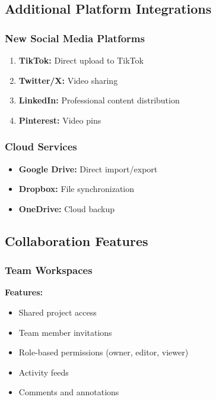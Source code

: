 \subsection{Additional Platform Integrations}

\subsubsection{New Social Media Platforms}

\begin{enumerate}
    \item \textbf{TikTok:} Direct upload to TikTok
    \item \textbf{Twitter/X:} Video sharing
    \item \textbf{LinkedIn:} Professional content distribution
    \item \textbf{Pinterest:} Video pins
\end{enumerate}

\subsubsection{Cloud Services}

\begin{itemize}
    \item \textbf{Google Drive:} Direct import/export
    \item \textbf{Dropbox:} File synchronization
    \item \textbf{OneDrive:} Cloud backup
\end{itemize}

\subsection{Collaboration Features}

\subsubsection{Team Workspaces}

\textbf{Features:}

\begin{itemize}
    \item Shared project access
    \item Team member invitations
    \item Role-based permissions (owner, editor, viewer)
    \item Activity feeds
    \item Comments and annotations
\end{itemize}

